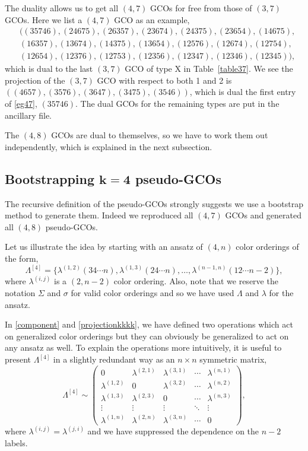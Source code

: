 \documentclass[pdftex]{sigma}
\theoremstyle{definition}
\def \be {\begin{equation}}
\def \ee {\end{equation}}
\def \ba {\begin{eqnarray}}
\def \ea {\end{eqnarray}}
\def \be {\begin{equation}}
\numberwithin{equation}{section}
\begin{document}
The duality allows us to get all $(4,7)$ GCOs for free from those of $(3,7)$ GCOs. Here we list a $(4,7)$ GCO as an example,
\ba
\label{eg47}
&((3 5 7 4 6),(2 4 6 7 5),(2 6 3 5 7),(2 3 6 7 4),(2 4 3 7 5),(2 3 6 5 4),(1 4 6 7 5),
\nonumber
\\
&(1 6 3 5 7),(1 3 6 7 4),(1 4 3 7 5),(1 3 6 5 4),(1 2 5 7 6),(1 2 6 7 4),(1 2 7 5 4),
\nonumber
\\
&(1 2 6 5 4),(1 2 3 7 6),(1 2 7 5 3),(1 2 3 5 6),(1 2 3 4 7),(1 2 3 4 6),(1 2 3 4 5)),
\ea
which is dual to the last $(3,7)$ GCO of type X in Table~\ref{table37}. We see the projection of the $(3,7)$ GCO with respect to both 1 and 2 is $((4 6 5 7),(3 5 7 6),(3 6 4 7),(3 4 7 5),(3 5 4 6))$, which is dual the first entry of \eqref{eg47}, $(3 5 7 4 6)$. The dual GCOs for the remaining types are put in the ancillary file.

The $(4,8)$ GCOs are dual to themselves, so we have to work them out independently, which is explained in the next subsection.

\subsection[Bootstrapping k=4 pseudo-GCOs]{Bootstrapping $\boldsymbol{k=4}$ pseudo-GCOs}\label{Bootstrappingk4gco}

The recursive definition of the pseudo-GCOs strongly suggests we use a bootstrap method to generate them. Indeed we reproduced all $(4,7)$ GCOs and generated all $(4,8)$ pseudo-GCOs.

Let us illustrate the idea by starting with an ansatz of $(4,n)$ color orderings of the form,
\[
\Lambda^{[4]}=
\big\{
\lambda^{(1,2)}(34\cdots n), \lambda^{(1,3)}(24\cdots n), \dots, \lambda^{(n-1,n)}(12\cdots n-2)
\big\},
\]
where $\lambda^{(i,j)}$ is a $(2,n-2)$ color ordering. Also, note that we reserve the notation $\Sigma$ and $\sigma$ for valid color orderings and so we have used $\Lambda$ and $\lambda$ for the ansatz.

In \eqref{component}
and \eqref{projectionkkkk}, we have defined two operations which act on generalized color orderings but they can obviously be generalized to act on any ansatz as well. To explain the operations more intuitively,
it is useful to present $\Lambda^{[4]}$ in a slightly redundant way as an $n\times n$ symmetric matrix,
\be
\label{matrixform}
\Lambda^{[4]}\sim
\begin{pmatrix}
0& \lambda^{(2,1)} & \lambda^{(3,1)} & \cdots & \lambda^{(n,1)} \\
\lambda^{(1,2)} & 0 & \lambda^{(3,2)} & \cdots & \lambda^{(n,2)} \\
\lambda^{(1,3)} & \lambda^{(2,3)} & 0 & \cdots & \lambda^{(n,3)} \\
\vdots & \vdots &\vdots &\ddots &\vdots
\\
\lambda^{(1,n)} & \lambda^{(2,n)} & \lambda^{(3,n)} & \cdots & 0
\end{pmatrix},
\ee
%
where $\lambda^{(i,j)} =\lambda^{(j,i)}$ and we have suppressed the dependence on the $n-2$ labels.
\end{document}
